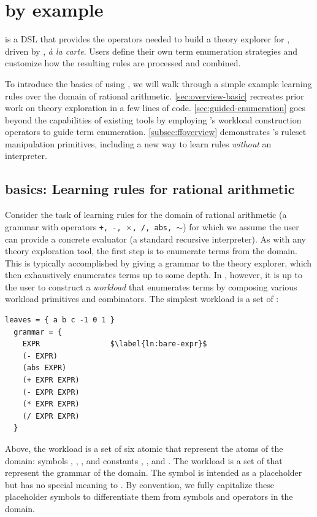 \section{\enumo by example}
\label{sec:overview}
\enumo is a DSL that provides
 the operators needed to build a
 theory explorer for \eqsat,
 driven by \eqsat, \textit{\`a la carte}.
Users define their own term enumeration strategies and
customize how the resulting rules are processed
and combined.

To introduce the basics of using \enumo,
 we will walk through a simple example
 learning rules over the domain of rational arithmetic.
 \autoref{sec:overview-basic}
 recreates prior work on theory exploration \citep{ruler}
 in a few lines of \enumo code.
\autoref{sec:guided-enumeration}
 goes beyond the capabilities of existing tools
 by employing \enumo's workload construction operators
 to guide term enumeration.
\autoref{subsec:ffoverview}
 demonstrates \enumo's ruleset manipulation primitives,
 including a new way to learn rules
 \emph{without} an interpreter.

\subsection{\enumo basics: Learning rules for rational arithmetic}
\label{sec:overview-basic}
\label{subsec:basic}
Consider the task of
  learning rules for the domain of
 rational arithmetic
 (a grammar with operators \texttt{+, -, $\times$, /, abs, $\sim$})
 for which we assume the user can provide a
 concrete evaluator (a standard recursive
 interpreter).
As with any theory exploration tool,
 the first step is to
 enumerate terms from the domain.
This is typically accomplished by giving a grammar
 to the theory explorer, which then exhaustively enumerates
 terms up to some depth.
In \enumo, however, it is up to the user
 to construct a \emph{workload} that enumerates terms
 by composing various workload primitives and combinators.
The simplest workload is a set of \sexps:
\begin{lstlisting}[name=overview]
  leaves = { a b c -1 0 1 }
  grammar = {
    EXPR                $\label{ln:bare-expr}$
    (- EXPR)
    (abs EXPR)
    (+ EXPR EXPR)
    (- EXPR EXPR)
    (* EXPR EXPR)
    (/ EXPR EXPR)
  }
\end{lstlisting}

Above, the  workload is a set of six atomic \sexps
 that represent the atoms of the domain:
 symbols , , , and constants , , and .
The  workload is a set of
  \sexps that represent the grammar of the domain.
The  symbol is intended as a placeholder
 but has no special meaning to \enumo.
By convention, we fully capitalize these placeholder
  symbols to differentiate them from symbols
  and operators in the domain.

